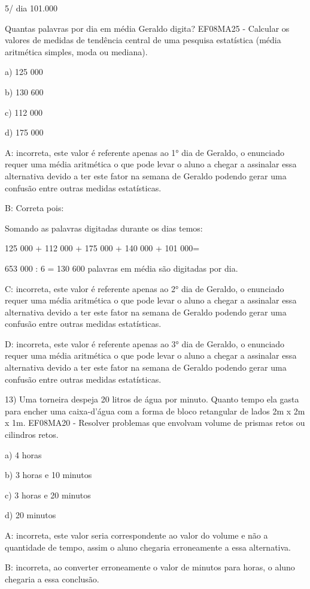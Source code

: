 5/ dia 101.000

Quantas palavras por dia em média Geraldo digita? EF08MA25 - Calcular os
valores de medidas de tendência central de uma pesquisa estatística
(média aritmética simples, moda ou mediana).

a) 125 000

b) 130 600

c) 112 000

d) 175 000

A: incorreta, este valor é referente apenas ao 1° dia de Geraldo, o
enunciado requer uma média aritmética o que pode levar o aluno a chegar
a assinalar essa alternativa devido a ter este fator na semana de
Geraldo podendo gerar uma confusão entre outras medidas estatísticas.

B: Correta pois:

Somando as palavras digitadas durante os dias temos:

125 000 + 112 000 + 175 000 + 140 000 + 101 000=

653 000 : 6 = 130 600 palavras em média são digitadas por dia.

C: incorreta, este valor é referente apenas ao 2° dia de Geraldo, o
enunciado requer uma média aritmética o que pode levar o aluno a chegar
a assinalar essa alternativa devido a ter este fator na semana de
Geraldo podendo gerar uma confusão entre outras medidas estatísticas.

D: incorreta, este valor é referente apenas ao 3° dia de Geraldo, o
enunciado requer uma média aritmética o que pode levar o aluno a chegar
a assinalar essa alternativa devido a ter este fator na semana de
Geraldo podendo gerar uma confusão entre outras medidas estatísticas.

13) Uma torneira despeja 20 litros de água por minuto. Quanto tempo ela
gasta para encher uma caixa-d'água com a forma de bloco retangular de
lados 2m x 2m x 1m. EF08MA20 - Resolver problemas que envolvam volume de
prismas retos ou cilindros retos.

a) 4 horas

b) 3 horas e 10 minutos

c) 3 horas e 20 minutos

d) 20 minutos

A: incorreta, este valor seria correspondente ao valor do volume e não a
quantidade de tempo, assim o aluno chegaria erroneamente a essa
alternativa.

B: incorreta, ao converter erroneamente o valor de minutos para horas, o
aluno chegaria a essa conclusão.

